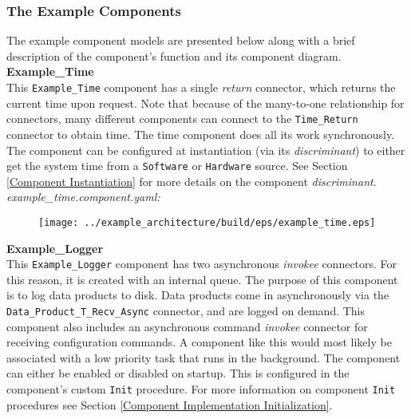 \subsubsection{The Example Components} \label{The Example Components}

The example component models are presented below along with a brief description of the component's function and its component diagram. \\

\textbf{Example\_Time} \\

This \texttt{Example\_Time} component has a single \textit{return} connector, which returns the current time upon request. Note that because of the many-to-one relationship for connectors, many different components can connect to the \texttt{Time\_Return} connector to obtain time. The time component does all its work synchronously. The component can be configured at instantiation (via its \textit{discriminant}) to either get the system time from a \texttt{Software} or \texttt{Hardware} source. See Section \ref{Component Instantiation} for more details on the component \textit{discriminant}. \\

\textit{example\_time.component.yaml:}

\begin{figure}[H]
  \texttt{[image: ../example\_architecture/build/eps/example\_time.eps]}
\end{figure}

\textbf{Example\_Logger} \\

This \texttt{Example\_Logger} component has two asynchronous \textit{invokee} connectors. For this reason, it is created with an internal queue. The purpose of this component is to log data products to disk. Data products come in asynchronously via the \texttt{Data\_Product\_T\_Recv\_Async} connector, and are logged on demand. This component also includes an asynchronous command \textit{invokee} connector for receiving configuration commands. A component like this would most likely be associated with a low priority task that runs in the background. The component can either be enabled or disabled on startup. This is configured in the component's custom \texttt{Init} procedure. For more information on component \texttt{Init} procedures see Section \ref{Component Implementation Initialization}. \\

